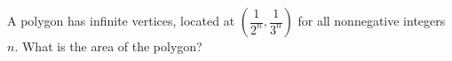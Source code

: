 A polygon has infinite vertices, located at $( \dfrac{1}{2^n} , \dfrac{1}{3^n})$ for all nonnegative integers $n$. What is the area of the polygon?
